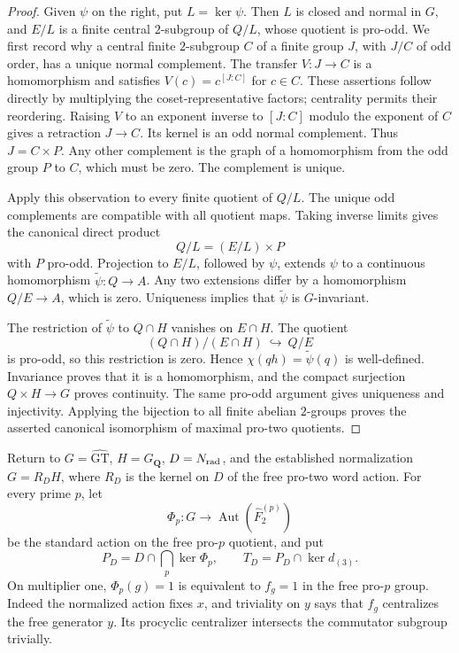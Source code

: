 \begin{proof}
Given \(\psi\) on the right, put \(L=\ker\psi\).
Then \(L\) is closed and normal in \(G\), and \(E/L\) is a
finite central \(2\)-subgroup of \(Q/L\), whose quotient is pro-odd.
We first record why a central finite \(2\)-subgroup \(C\) of a
finite group \(J\), with \(J/C\) of odd order, has a unique normal
complement. The transfer \(V:J\to C\) is a homomorphism and
satisfies \(V(c)=c^{[J:C]}\) for \(c\in C\). These assertions
follow directly by multiplying the coset-representative factors;
centrality permits their reordering. Raising \(V\) to an exponent
inverse to \([J:C]\) modulo the exponent of \(C\) gives a
retraction \(J\to C\). Its kernel is an odd normal complement.
Thus \(J=C\times P\). Any other complement is the graph of a
homomorphism from the odd group \(P\) to \(C\), which must be
zero. The complement is unique.

Apply this observation to every finite quotient of \(Q/L\).
The unique odd complements are compatible with all quotient maps.
Taking inverse limits gives the canonical direct product
\[
                    Q/L=(E/L)\times P
\]
with \(P\) pro-odd. Projection to \(E/L\), followed by \(\psi\),
extends \(\psi\) to a continuous homomorphism \(\widetilde\psi:Q\to A\).
Any two extensions differ by a homomorphism \(Q/E\to A\),
which is zero. Uniqueness implies that \(\widetilde\psi\) is
\(G\)-invariant.

The restriction of \(\widetilde\psi\) to \(Q\cap H\) vanishes on
\(E\cap H\). The quotient
\[
 (Q\cap H)/(E\cap H)\ \hookrightarrow\ Q/E
\]
is pro-odd, so this restriction is zero. Hence
\(\chi(qh)=\widetilde\psi(q)\) is well-defined.
Invariance proves that it is a homomorphism, and the compact
surjection \(Q\times H\to G\) proves continuity.
The same pro-odd argument gives uniqueness and injectivity.
Applying the bijection to all finite abelian \(2\)-groups proves
the asserted canonical isomorphism of maximal pro-two quotients.
\end{proof}

Return to \(G=\widehat{\mathrm{GT}}\), \(H=G_{\mathbf Q}\),
\(D=N_{\rm rad}\), and the established normalization
\(G=R_DH\), where \(R_D\) is the kernel on \(D\) of the
free pro-two word action. For every prime \(p\), let
\[
 \Phi_p:G\longrightarrow
       \operatorname{Aut}(\widehat F_2^{(p)})
\]
be the standard action on the free pro-\(p\) quotient, and put
\[
 P_D=D\cap\bigcap_p\ker\Phi_p,\qquad
 T_D=P_D\cap\ker d_{(3)}.
\]
On multiplier one, \(\Phi_p(g)=1\) is equivalent to \(f_g=1\)
in the free pro-\(p\) group. Indeed the normalized action fixes
\(x\), and triviality on \(y\) says that \(f_g\) centralizes
the free generator \(y\). Its procyclic centralizer intersects
the commutator subgroup trivially.

